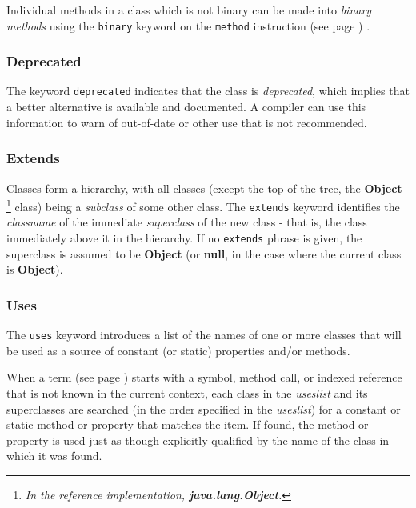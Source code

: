 Individual methods in a class which is not binary can be made into
\emph{binary methods} using the \texttt{binary} keyword on the
 \texttt{method} instruction (see page \pageref{refmethod}) .
\subsubsection{Deprecated}\label{refdepcla}
 
The keyword \texttt{deprecated} indicates that the class
is \emph{deprecated}, which implies that a better alternative is
available and documented.  A compiler can use this information to warn
of out-of-date or other use that is not recommended.
\subsubsection{Extends}
 
Classes form a hierarchy, with all classes (except the top of the tree,
the \textbf{Object}
\footnote{
\emph{In the reference implementation, \textbf{java.lang.Object}.}
}
class) being a \emph{subclass} of some other class.
The \texttt{extends} keyword identifies the \emph{classname} of the
immediate \emph{superclass} of the new class - that is, the
class immediately above it in the hierarchy.
If no \texttt{extends} phrase is given, the superclass is assumed to
be \textbf{Object} (or \textbf{null}, in the case where the current
class is \textbf{Object}).
\subsubsection{Uses}
 
The \texttt{uses} keyword introduces a list of the names of one or
more classes that will be used as a source of constant (or static)
properties and/or methods.
 
When a  term (see page \pageref{refterms})  starts with a symbol, method call, or
indexed reference that is not known in the current context, each class
in the \emph{useslist} and its superclasses are searched (in the
order specified in the \emph{useslist}) for a constant or static
method or property that matches the item.
If found, the method or property is used just as though explicitly
qualified by the name of the class in which it was found.
 
